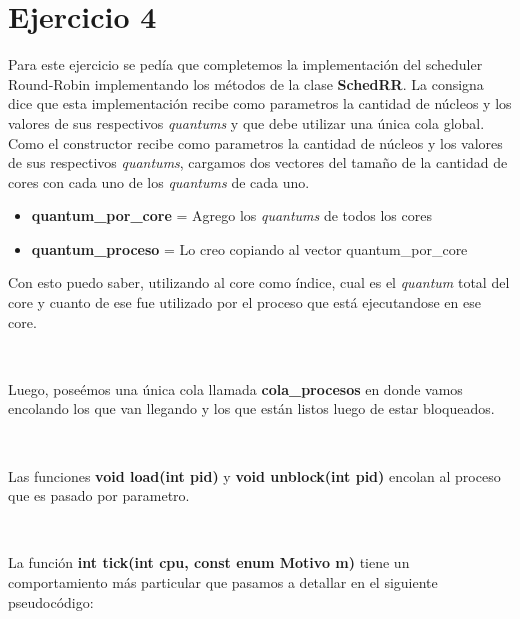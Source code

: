 \section{Ejercicio 4}

Para este ejercicio se pedía que completemos la implementación del scheduler Round-Robin implementando los métodos de la clase \textbf{SchedRR}. La consigna dice que esta implementación recibe como parametros la cantidad de núcleos y los valores de sus respectivos \textit{quantums} y que debe utilizar una única cola global.
~
Como el constructor recibe como parametros la cantidad de núcleos y los valores de sus respectivos \textit{quantums}, cargamos dos vectores del tamaño de la cantidad de cores con cada uno de los \textit{quantums} de cada uno.

\begin{itemize}
	\item \textbf{quantum\_por\_core} = Agrego los \textit{quantums} de todos los cores
	\item \textbf{quantum\_proceso} = Lo creo copiando al vector quantum\_por\_core
\end{itemize}

Con esto puedo saber, utilizando al core como índice, cual es el \textit{quantum} total del core y cuanto de ese fue utilizado por el proceso que está ejecutandose en ese core.

~

Luego, poseémos una única cola llamada \textbf{cola\_procesos} en donde vamos encolando los que van llegando y los que están listos luego de estar bloqueados.

~

Las funciones \textbf{void load(int pid)} y \textbf{void unblock(int pid)} encolan al proceso que es pasado por parametro.

~

La función \textbf{int tick(int cpu, const enum Motivo m)} tiene un comportamiento más particular que pasamos a detallar en el siguiente pseudocódigo:

~

